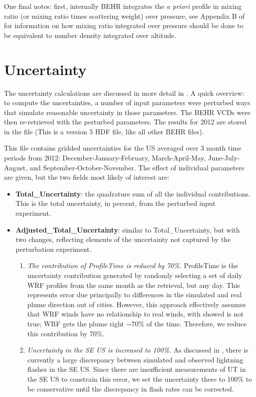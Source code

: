\documentclass[12pt]{article}
\begin{document}
	One final notes: first, internally BEHR integrates the \emph{a priori} profile in mixing ratio (or mixing ratio times scattering weight) over pressure, see Appendix B of \citet{ziemka01} for information on how mixing ratio integrated over pressure should be done to be equivalent to number density integrated over altitude. 
	
\section{Uncertainty}

The uncertainty calculations are discussed in more detail in \citet{laughner18b}. A quick overview: to compute the uncertainties, a number of input parameters were perturbed ways that simulate reasonable uncertainty in those parameters. The BEHR  VCDs were then re-retrieved with the perturbed parameters. The results for 2012 are stored in the file  (This is a version 5 HDF file, like all other BEHR files). 

This file contains gridded uncertainties for the US averaged over 3 month time periods from 2012: December-January-February, March-April-May, June-July-August, and September-October-November. The effect of individual parameters are given, but the two fields most likely of interest are:

\begin{itemize}
\item \textbf{Total\_Uncertainty}: the quadrature sum of all the individual contributions. This is the total uncertainty, in percent, from the perturbed input experiment.
\item \textbf{Adjusted\_Total\_Uncertainty}: similar to Total\_Uncertainty, but with two changes, reflecting elements of the uncertainty not captured by the perturbation experiment.
	\begin{enumerate}
	\item \emph{The contribution of ProfileTime is reduced by 70\%.} ProfileTime is the uncertainty contribution generated by randomly selecting a set of daily WRF profiles from the same month as the retrieval, but any day. This represents error due principally to differences in the simulated and real plume direction out of cities. However, this approach effectively assumes that WRF winds have no relationship to real winds, with \citet{laughner18b} showed is not true; WRF gets the plume right $\sim 70\%$ of the time. Therefore, we reduce this contribution by 70\%.
	\item \emph{Uncertainty in the SE US is increased to 100\%.} As discussed in \citet{laughner18b}, there is currently a large discrepancy between simulated and observed lightning flashes in the SE US. Since there are insufficient measurements of UT  in the SE US to constrain this error, we set the uncertainty there to 100\% to be conservative until the discrepancy in flash rates can be corrected.
	\end{enumerate}
\end{itemize}	
\end{document}
